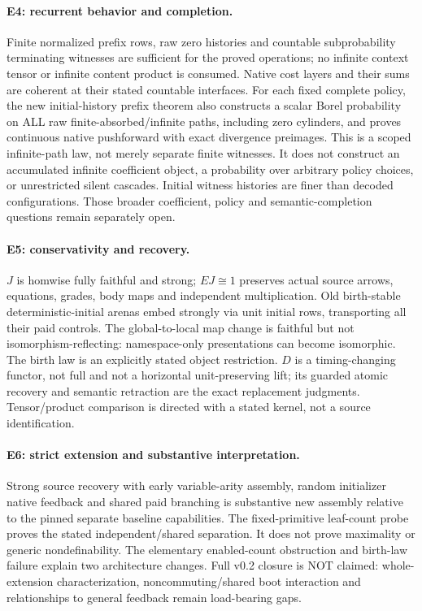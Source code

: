 \documentclass[11pt]{article}
\begin{document}
\paragraph{E4: recurrent behavior and completion.}
Finite normalized prefix rows, raw zero histories and countable subprobability
terminating witnesses are sufficient for the proved operations; no infinite
context tensor or infinite content product is consumed. Native cost layers
and their sums are coherent at their stated countable interfaces. For each fixed complete policy, the new initial-history prefix theorem also
constructs a scalar Borel probability on ALL raw finite-absorbed/infinite paths,
including zero cylinders, and proves continuous native pushforward with exact
divergence preimages. This is a scoped infinite-path law, not merely separate
finite witnesses. It does not construct an accumulated infinite coefficient
object, a probability over arbitrary policy choices, or unrestricted silent
cascades. Initial witness histories are finer than decoded configurations.
Those broader coefficient, policy and semantic-completion questions remain
separately open.

\paragraph{E5: conservativity and recovery.}
$J$ is homwise fully faithful and strong; $EJ\cong1$ preserves actual source
arrows, equations, grades, body maps and independent multiplication. Old
birth-stable deterministic-initial arenas embed strongly via unit initial
rows, transporting all their paid controls. The global-to-local map change
is faithful but not isomorphism-reflecting: namespace-only presentations can
become isomorphic. The birth law is an explicitly stated object restriction.
$D$ is a timing-changing functor, not full and not a horizontal unit-preserving
lift; its guarded atomic recovery and semantic retraction are the exact
replacement judgments. Tensor/product comparison is directed with a stated
kernel, not a source identification.

\paragraph{E6: strict extension and substantive interpretation.}
Strong source recovery with early variable-arity assembly, random initializer
native feedback and shared paid branching is substantive new assembly relative
to the pinned separate baseline capabilities. The fixed-primitive leaf-count
probe proves the stated independent/shared separation. It does not prove
maximality or generic nondefinability. The elementary enabled-count obstruction
and birth-law failure explain two architecture changes. Full v0.2 closure
is NOT claimed: whole-extension characterization, noncommuting/shared boot
interaction and relationships to general feedback remain load-bearing gaps.
\end{document}
